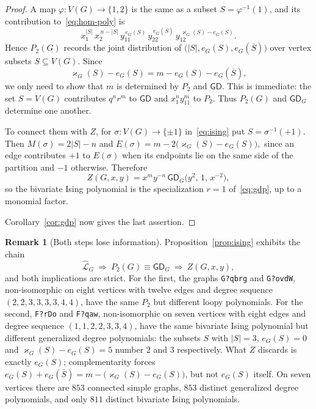 \documentclass[11pt]{article}
\theoremstyle{plain}
\theoremstyle{definition}
\newtheorem{remark}[theorem]{Remark}
\renewcommand{\mathcal}{\mathscr}
\newcommand{\LL}{\mathcal{L}}    %
\newcommand{\GD}{\mathsf{GD}}    %
\newcommand{\kp}{\varkappa}
\numberwithin{equation}{section}
\begin{document}
\begin{proof}
A map $\varphi:V(G)\to\{1,2\}$ is the same as a subset
$S=\varphi^{-1}(1)$, and its contribution to~\eqref{eq:hom-poly} is
\[
   x_1^{|S|}\,x_2^{\,n-|S|}\,
   y_{11}^{\,e_G(S)}\,y_{22}^{\,e_G(\overline S)}\,
   y_{12}^{\,\kp_G(S)-e_G(S)} .
\]
Hence $P_2(G)$ records the joint distribution of
$\bigl(|S|,e_G(S),e_G(\overline S)\bigr)$ over vertex subsets $S\subseteq V(G)$.
Since
\[
  \kp_G(S)-e_G(S)=m-e_G(S)-e_G(\overline S),
\]
we only need to show that $m$ is determined by $P_2$ and $\GD$.
This is immediate: the set $S=V(G)$  contributes $q^n r^m$  to $\GD$ and $x_1^n y_{11}^m$ to $P_2$.
Thus  $P_2(G)$ and $\GD_G$ determine one another.

To connect them with $Z$, for $\sigma:V(G)\to\{\pm 1\}$ in~\eqref{eq:ising} put  $S=\sigma^{-1}(+1)$.
Then $M(\sigma)=2|S|-n$ and $E(\sigma)=m-2\bigl(\kp_G(S)-e_G(S)\bigr),$
since an edge contributes $+1$ to $E(\sigma)$ when its endpoints lie on
the same side of the partition and $-1$ otherwise. Therefore
\begin{equation}\label{eq:ising-from-gdp}
    Z(G,x,y)=x^{m}y^{-n}\,\GD_G\bigl(y^{2},\,1,\,x^{-2}\bigr),
\end{equation}
so the bivariate Ising polynomial is the specialization $r=1$ of~\eqref{eq:gdp}, up to a monomial factor.


Corollary~\ref{cor:gdp} now gives the last assertion.
\end{proof}

\begin{remark}[Both steps lose information]\label{rem:ising-strict}
Proposition~\ref{prop:ising} exhibits the chain
\[
 \widehat{\LL}_G \ \Longrightarrow \
 P_2(G)\equiv\GD_G  \ \Longrightarrow \    Z(G,x,y),
\]
and both implications are strict. For the first, the graphs \verb+G?qbrg+ and \verb+G?ovdW+,
non-isomorphic on eight vertices with twelve edges and degree
sequence $(2,2,3,3,3,3,4,4)$, have the same $P_2$ but different loopy polynomials.
For the second, \verb+F?rDo+ and \verb+F?qaw+, non-isomorphic on seven vertices with eight edges
and degree sequence $(1,1,2,2,3,3,4)$, have
the same bivariate Ising polynomial but different generalized degree polynomials:
the subsets $S$ with $|S|=3$, $e_G(S)=0$ and $\kp_G(S)-e_G(S)=5$ number $2$ and $3$ respectively.
What $Z$ discards is exactly $e_G(S)$; complementarity forces $e_G(S)+e_G(\overline S)=m-\bigl(\kp_G(S)-e_G(S)\bigr)$, but not $e_G(S)$
itself.
On seven vertices there are $853$ connected simple graphs, $853$ distinct generalized
degree polynomials, and only $811$ distinct bivariate Ising polynomials.
\end{remark}
\end{document}
